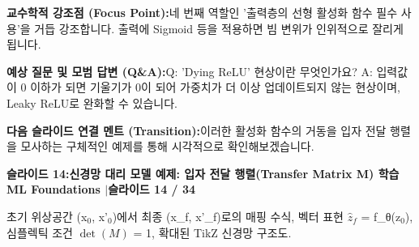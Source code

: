\documentclass[11pt,a4paper]{article}
\begin{document}
\vspace{0.2em}
\begin{tcolorbox}[colback=lightbg,colframe=bordergray,left=6pt,right=6pt,top=3pt,bottom=3pt,boxrule=0.6pt,arc=2.5pt]
\small
\noindent\textbf{\color{navy}교수학적 강조점 (Focus Point):}\enspace 네 번째 역할인 '출력층의 선형 활성화 함수 필수 사용'을 거듭 강조합니다. 출력에 Sigmoid 등을 적용하면 빔 변위가 인위적으로 잘리게 됩니다.\par\vspace{0.3em}
\noindent\textbf{\color{successgreen}예상 질문 및 모범 답변 (Q\&A):}\enspace Q: 'Dying ReLU' 현상이란 무엇인가요? A: 입력값이 0 이하가 되면 기울기가 0이 되어 가중치가 더 이상 업데이트되지 않는 현상이며, Leaky ReLU로 완화할 수 있습니다.\par\vspace{0.3em}
\noindent\textbf{\color{accent}다음 슬라이드 연결 멘트 (Transition):}\enspace 이러한 활성화 함수의 거동을 입자 전달 행렬을 모사하는 구체적인 예제를 통해 시각적으로 확인해보겠습니다.
\end{tcolorbox}
\clearpage
\hypertarget{slide.14}{}
{}
\noindent\begin{tcolorbox}[colback=navy,colframe=navy,left=6pt,right=6pt,top=3pt,bottom=3pt,boxrule=0pt,arc=2pt]
{\large\bfseries\color{white}슬라이드 14:\enspace 신경망 대리 모델 예제: 입자 전달 행렬(Transfer Matrix M) 학습}\hfill{\footnotesize\bfseries\color{white!85!lightbg}ML Foundations \enspace$|$\enspace 슬라이드 14 / 34}
\end{tcolorbox}
\vspace{0.2em}
\begin{tcolorbox}[colback=lightbg,colframe=bordergray,title={\footnotesize\bfseries\color{darkgray}슬라이드 시각 구성 요약},fontupper=\small,left=6pt,right=6pt,top=2.5pt,bottom=2.5pt,boxrule=0.6pt,arc=2.5pt]
초기 위상공간 (x$_0$, x'$_0$)에서 최종 (x\_f, x'\_f)로의 매핑 수식, 벡터 표현 $\hat{z}_f$ = f\_θ(z$_0$), 심플렉틱 조건 $\det(M)$ = 1, 확대된 TikZ 신경망 구조도.
\end{tcolorbox}
\vspace{0.2em}
\end{document}
